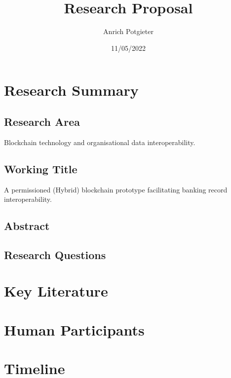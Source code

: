 \documentclass[12pt]{article}
\title{Research Proposal}
\author{Anrich Potgieter}
\date{11/05/2022}
\begin{document}
\maketitle
\tableofcontents

\section{Research Summary}

\subsection{Research Area}
Blockchain technology and organisational data interoperability.

\subsection{Working Title}
A permissioned (Hybrid) blockchain prototype facilitating banking record interoperability.

\subsection{Abstract}

\subsection{Research Questions}

\section{Key Literature}

\section{Human Participants}

\section{Timeline}
\end{document}
